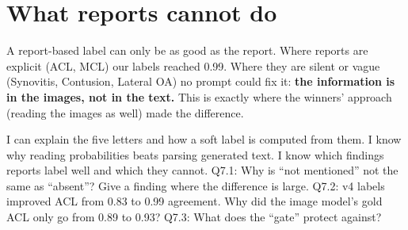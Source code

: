 \section{What reports cannot do}

\begin{keyidea}
A report-based label can only be as good as the report. Where reports are explicit (ACL, MCL) our labels reached
0.99. Where they are silent or vague (Synovitis, Contusion, Lateral OA) no prompt could fix it: \textbf{the
information is in the images, not in the text.} This is exactly where the winners' approach (reading the images
as well) made the difference.
\end{keyidea}

\begin{checkpoint}
\begin{itemize}
\done I can explain the five letters and how a soft label is computed from them.
\done I know why reading probabilities beats parsing generated text.
\done I know which findings reports label well and which they cannot.
\quiz Q7.1: Why is ``not mentioned'' not the same as ``absent''? Give a finding where the difference is large.
\quiz Q7.2: v4 labels improved ACL from 0.83 to 0.99 agreement. Why did the image model's gold ACL only go from
      0.89 to 0.93?
\quiz Q7.3: What does the ``gate'' protect against?
\end{itemize}
\end{checkpoint}
